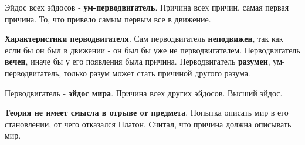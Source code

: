 \documentclass{article}
\begin{document}
\begin{flushleft}
\hfill

Эйдос всех эйдосов - \textbf{ум-перводвигатель}. Причина всех причин, самая первая причина. То, что привело самым первым все в движение.

\hfill

\textbf{Характеристики перводвигателя}. Сам перводвигатель \textbf{неподвижен}, так как если бы он был в движении - он был бы уже не перводвигателем. Перводвигатель \textbf{вечен}, иначе бы у его появления была причина. Перводвигатель \textbf{разумен}, ум-перводвигатель, только разум может стать причиной другого разума. 

Перводвигатель - \textbf{эйдос мира}. Причина всех других эйдосов. Высший эйдос.

\hfill

\textbf{Теория не имеет смысла в отрыве от предмета}. Попытка описать мир в его становлении, от чего отказался Платон. Считал, что причина должна описывать мир.

\end{flushleft}
\end{document}
